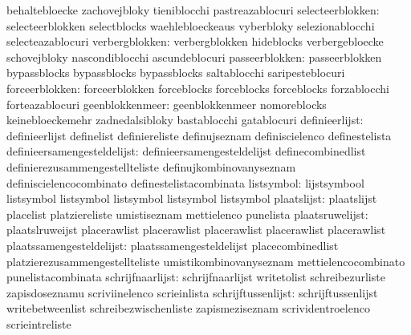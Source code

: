                                   behaltebloecke                   zachovejbloky
                                  tieniblocchi                     pastreazablocuri
               selecteerblokken:  selecteerblokken                 selectblocks
                                  waehlebloeckeaus                 vyberbloky
                                  selezionablocchi                 selecteazablocuri
                 verbergblokken:  verbergblokken                   hideblocks
                                  verbergebloecke                  schovejbloky
                                  nascondiblocchi                  ascundeblocuri
                 passeerblokken:  passeerblokken                   bypassblocks
                                  bypassblocks                     bypassblocks
                                  saltablocchi                     saripesteblocuri
                 forceerblokken:  forceerblokken                   forceblocks
                                  forceblocks                      forceblocks
                                  forzablocchi                     forteazablocuri
                geenblokkenmeer:  geenblokkenmeer                  nomoreblocks
                                  keinebloeckemehr                 zadnedalsibloky
                                  bastablocchi                     gatablocuri
                 definieerlijst:  definieerlijst                   definelist
                                  definiereliste                   definujseznam
                                  definiscielenco                  definestelista
    definieersamengesteldelijst:  definieersamengesteldelijst      definecombinedlist
                                  definierezusammengestellteliste  definujkombinovanyseznam
                                  definiscielencocombinato         definestelistacombinata
listsymbol: lijstsymbool listsymbol
            listsymbol   listsymbol
            listsymbol   listsymbol
                    plaatslijst:  plaatslijst                      placelist
                                  platziereliste                   umistiseznam
                                  mettielenco                      punelista
                plaatsruwelijst:  plaatslruweijst                  placerawlist
                                  placerawlist                     placerawlist
                                  placerawlist                     placerawlist
       plaatssamengesteldelijst:  plaatssamengesteldelijst         placecombinedlist
                                  platzierezusammengestellteliste  umistikombinovanyseznam
                                  mettielencocombinato             punelistacombinata
               schrijfnaarlijst:  schrijfnaarlijst                 writetolist
                                  schreibezurliste                 zapisdoseznamu
                                  scriviinelenco                   scrieinlista
             schrijftussenlijst:  schrijftussenlijst               writebetweenlist
                                  schreibezwischenliste            zapismeziseznam
                                  scrividentroelenco               scrieintreliste

